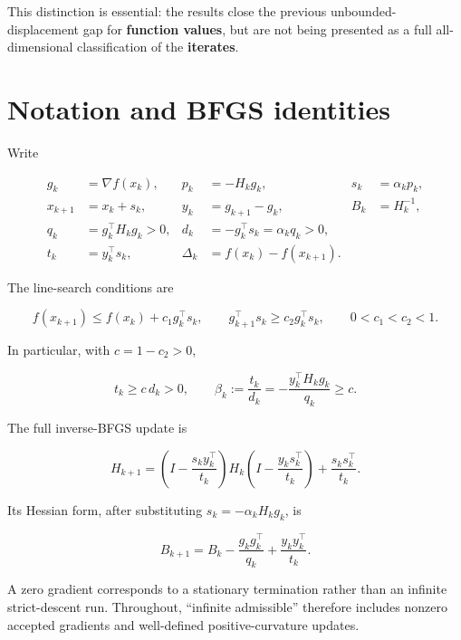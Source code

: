 This distinction is essential: the results close the previous
unbounded-displacement gap for \textbf{function values}, but are not
being presented as a full all-dimensional classification of the
\textbf{iterates}.


\setcounter{section}{1}
\setcounter{theorem}{0}
\setcounter{lemma}{0}
\setcounter{corollary}{0}
\setcounter{proposition}{0}
\setcounter{remark}{0}
\setcounter{equation}{0}


\section{Notation and BFGS
identities}\label{H:notation-and-bfgs-identities}

Write

\[
\begin{aligned}
g_k&=\nabla f(x_k),&p_k&=-H_kg_k,&s_k&=\alpha_kp_k,\\
x_{k+1}&=x_k+s_k,&y_k&=g_{k+1}-g_k,&B_k&=H_k^{-1},\\
q_k&=g_k^\top H_kg_k>0,&d_k&=-g_k^\top s_k=\alpha_kq_k>0,\\
t_k&=y_k^\top s_k,&\Delta_k&=f(x_k)-f(x_{k+1}).
\end{aligned}
\]

The line-search conditions are

\[
f(x_{k+1})\le f(x_k)+c_1g_k^\top s_k,
\qquad
g_{k+1}^\top s_k\ge c_2g_k^\top s_k,
\qquad0<c_1<c_2<1.
\]

In particular, with \(c=1-c_2>0\),

\[
t_k\ge c\,d_k>0,
\qquad
\beta_k:=\frac{t_k}{d_k}
=-\frac{y_k^\top H_kg_k}{q_k}\ge c.
\]

The full inverse-BFGS update is

\[
H_{k+1}=
\left(I-\frac{s_ky_k^\top}{t_k}\right)
H_k
\left(I-\frac{y_ks_k^\top}{t_k}\right)
+\frac{s_ks_k^\top}{t_k}.
\]

Its Hessian form, after substituting \(s_k=-\alpha_kH_kg_k\), is

\[
\boxed{B_{k+1}=B_k-\frac{g_kg_k^\top}{q_k}
+\frac{y_ky_k^\top}{t_k}.}
\tag{7.2.1}
\]

A zero gradient corresponds to a stationary termination rather than an
infinite strict-descent run. Throughout, ``infinite admissible''
therefore includes nonzero accepted gradients and well-defined
positive-curvature updates.



\setcounter{section}{4}
\setcounter{theorem}{0}
\setcounter{lemma}{0}
\setcounter{corollary}{0}
\setcounter{proposition}{0}
\setcounter{remark}{0}
\setcounter{equation}{0}


